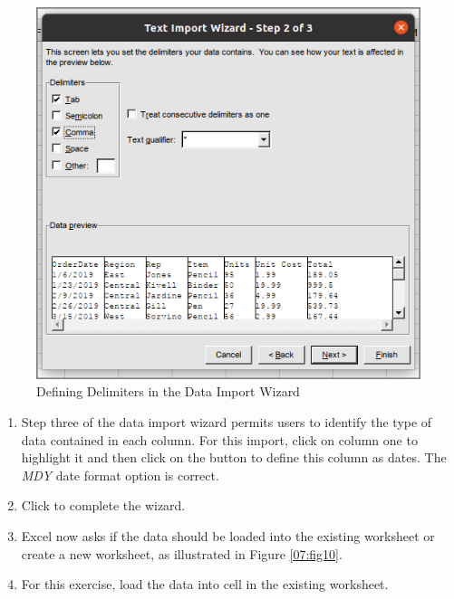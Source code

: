 \begin{figure}[H]
	\centering
	\includegraphics[width=\maxwidth{.95\linewidth}]{gfx/ch07_fig09}
	\caption{Defining Delimiters in the Data Import Wizard}
	\label{07:fig09}
\end{figure}

\begin{enumerate}
	\item Step three of the data import wizard permits users to identify the type of data contained in each column. For this import, click on column one to highlight it and then click on the  button to define this column as dates. The \textit{MDY} date format option is correct.
	\item Click  to complete the wizard.
	\item Excel now asks if the data should be loaded into the existing worksheet or create a new worksheet, as illustrated in Figure \ref{07:fig10}.
	\item For this exercise, load the data into cell  in the existing worksheet.
\end{enumerate}


